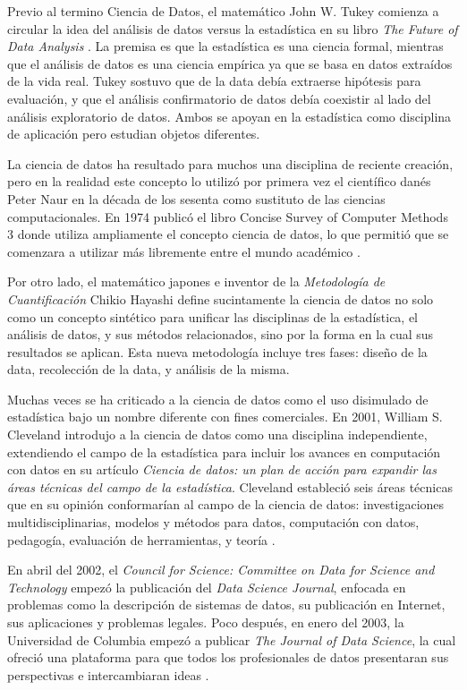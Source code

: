\begin{spacing}{1.5}
Previo al termino Ciencia de Datos, el matemático John W. Tukey comienza a circular la idea del análisis de datos versus la estadística en su libro \textit{The Future of Data Analysis} \cite{tukey}. La premisa es que la estadística es una ciencia formal, mientras que el análisis de datos es una ciencia empírica ya que se basa en datos extraídos de la vida real. Tukey sostuvo que de la data debía extraerse hipótesis para evaluación, y que el análisis confirmatorio de datos debía coexistir al lado del análisis exploratorio de datos. Ambos se apoyan en la estadística como disciplina de aplicación pero estudian objetos diferentes. 

La ciencia de datos \cite{wikipediaDS} ha resultado para muchos una disciplina de reciente creación, pero en la realidad este concepto lo utilizó por primera vez el científico danés Peter Naur en la década de los sesenta como sustituto de las ciencias computacionales. En 1974 publicó el libro Concise Survey of Computer Methods 3 donde utiliza ampliamente el concepto ciencia de datos, lo que permitió que se comenzara a utilizar más libremente entre el mundo académico \cite{naur}.  

Por otro lado, el matemático japones e inventor de la \textit{Metodología de Cuantificación} Chikio Hayashi define sucintamente \cite{hayashi} la ciencia de datos no solo como un concepto sintético para unificar las disciplinas de la estadística, el análisis de datos, y sus métodos relacionados, sino por la forma en la cual sus resultados se aplican. Esta nueva metodología incluye tres fases: diseño de la data, recolección de la data, y análisis de la misma. 

Muchas veces se ha criticado a la ciencia de datos como el uso disimulado de estadística bajo un nombre diferente con fines comerciales. En 2001, William S. Cleveland introdujo a la ciencia de datos como una disciplina independiente, extendiendo el campo de la estadística para incluir los avances en computación con datos en su artículo \textit{Ciencia de datos: un plan de acción para expandir las áreas técnicas del campo de la estadística}. Cleveland estableció seis áreas técnicas que en su opinión conformarían al campo de la ciencia de datos: investigaciones multidisciplinarias, modelos y métodos para datos, computación con datos, pedagogía, evaluación de herramientas, y teoría \cite{cleveland}.

En abril del 2002, el \textit{ Council for Science: Committee on Data for Science and Technology} \cite{CODATA} empezó la publicación del \textit{Data Science Journal}, enfocada en problemas como la descripción de sistemas de datos, su publicación en Internet, sus aplicaciones y problemas legales. Poco después, en enero del 2003, la Universidad de Columbia empezó a publicar \textit{The Journal of Data Science}, la cual ofreció una plataforma para que todos los profesionales de datos presentaran sus perspectivas e intercambiaran ideas \cite{wikipediaDS}.


\end{spacing}
